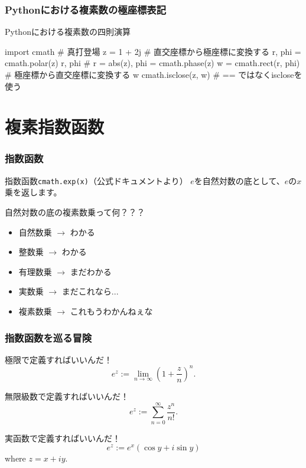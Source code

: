\documentclass[dvipdfmx,11pt,notheorems]{beamer}
\theoremstyle{definition}
\begin{document}
\begin{frame}[fragile]\frametitle{Pythonにおける複素数の極座標表記}
\begin{exampleblock}{Pythonにおける複素数の四則演算}
\begin{pyconsole}
import cmath  # 真打登場
z = 1 + 2j  # 直交座標から極座標に変換する
r, phi = cmath.polar(z)
r, phi  # r = abs(z), phi = cmath.phase(z)
w = cmath.rect(r, phi)  # 極座標から直交座標に変換する
w
cmath.isclose(z, w)  # == ではなくiscloseを使う
\end{pyconsole}
\end{exampleblock}

\end{frame}


\section{複素指数函数}

\begin{frame}\frametitle{指数函数}

\begin{block}{指数函数\texttt{cmath.exp(x)}（公式ドキュメントより）}
$e$を自然対数の底として、$e$の$x$乗を返します。
\end{block}

\begin{alertblock}{自然対数の底の複素数乗って何？？？}
\begin{itemize}
\item 自然数乗 $\rightarrow$ わかる
\item 整数乗 $\rightarrow$ わかる
\item 有理数乗 $\rightarrow$ まだわかる
\item 実数乗 $\rightarrow$ まだこれなら...
\item 複素数乗 $\rightarrow$ これもうわかんねぇな
\end{itemize}
\end{alertblock}

\end{frame}

\begin{frame}\frametitle{指数函数を巡る冒険}

\begin{block}{極限で定義すればいいんだ！}
\begin{equation*}
e^{z} := \lim_{n \to \infty}\left ( 1 + \frac{z}{n} \right )^{n}.
\end{equation*}
\end{block}

\begin{block}{無限級数で定義すればいいんだ！}
\begin{equation*}
e^{z} := \sum^{\infty}_{n=0}\frac{z^{n}}{n!}.
\end{equation*}
\end{block}

\begin{block}{実函数で定義すればいいんだ！}
\begin{equation*}
e^{z} := e^{x}(\cos{y}+i\sin{y}) 
\end{equation*}
where $z = x + iy$.
\end{block}

\end{frame}
\end{document}
